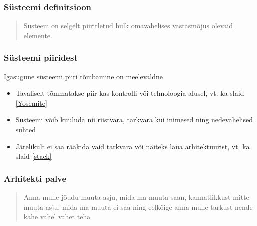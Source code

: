 \begin{frame}[fragile]
  \frametitle{Süsteemi definitsioon}
		\begin{center}
  			\begin{quote}
				Süsteem on selgelt piiritletud hulk omavahelises vastasmõjus olevaid elemente.
			\end{quote}
		\end{center}
\end{frame}

\begin{frame}[fragile]
  \frametitle{Süsteemi piiridest}
		Igasugune süsteemi piiri tõmbamine on meelevaldne
		\begin{itemize}
			\item Tavaliselt tõmmatakse piir kas kontrolli või tehnoloogia alusel, vt. ka slaid \ref{Yosemite}
			\item Süsteemi võib kuuluda nii riistvara, tarkvara kui inimesed ning nedevahelised suhted
			\item Järelikult ei saa rääkida vaid tarkvara või näiteks laua arhitektuurist, vt. ka slaid \ref{stack}
		\end{itemize}

\end{frame}

\begin{frame}[fragile]
  \frametitle{Arhitekti palve}
		\begin{center}
  			\begin{quote}
				Anna mulle jõudu muuta asju, mida ma muuta saan, kannatlikkust mitte muuta asju, mida ma muuta ei saa ning eelkõige anna mulle tarkust nende kahe vahel vahet teha
			\end{quote}
		\end{center}
\end{frame}

